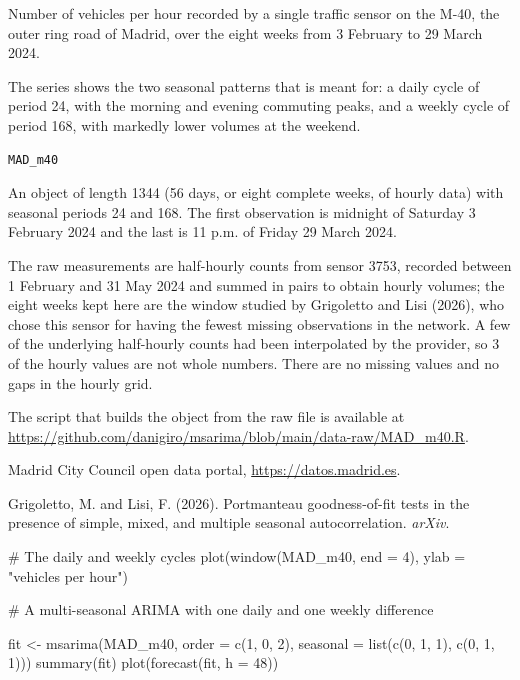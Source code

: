 \documentclass[a4paper]{book}
\begin{document}
%
\begin{Description}
Number of vehicles per hour recorded by a single traffic sensor on the M-40, the
outer ring road of Madrid, over the eight weeks from 3 February to 29 March 2024.

The series shows the two seasonal patterns that  is meant for:
a daily cycle of period 24, with the morning and evening commuting peaks, and a
weekly cycle of period 168, with markedly lower volumes at the weekend.
\end{Description}
%
\begin{Usage}
\begin{verbatim}
MAD_m40
\end{verbatim}
\end{Usage}
%
\begin{Format}
An  object of length 1344 (56 days, or eight complete weeks, of hourly
data) with seasonal periods 24 and 168. The first observation is midnight of
Saturday 3 February 2024 and the last is 11 p.m. of Friday 29 March 2024.
\end{Format}
%
\begin{Details}
The raw measurements are half-hourly counts from sensor 3753, recorded between
1 February and 31 May 2024 and summed in pairs to obtain hourly volumes; the eight
weeks kept here are the window studied by Grigoletto and Lisi (2026), who chose this
sensor for having the fewest missing observations in the network. A few of the
underlying half-hourly counts had been interpolated by the provider, so 3 of the
hourly values are not whole numbers. There are no missing values and no gaps in the
hourly grid.

The script that builds the object from the raw file is available at
\url{https://github.com/danigiro/msarima/blob/main/data-raw/MAD_m40.R}.
\end{Details}
%
\begin{Source}
Madrid City Council open data portal, \url{https://datos.madrid.es}.
\end{Source}
%
\begin{References}
Grigoletto, M. and Lisi, F. (2026). Portmanteau goodness-of-fit tests in the
presence of simple, mixed, and multiple seasonal autocorrelation. \emph{arXiv}.
\end{References}
%
\begin{Examples}
\begin{ExampleCode}
# The daily and weekly cycles
plot(window(MAD_m40, end = 4), ylab = "vehicles per hour")

# A multi-seasonal ARIMA with one daily and one weekly difference

fit <- msarima(MAD_m40,
               order = c(1, 0, 2),
               seasonal = list(c(0, 1, 1), c(0, 1, 1)))
summary(fit)
plot(forecast(fit, h = 48))

\end{ExampleCode}
\end{Examples}
\end{document}

